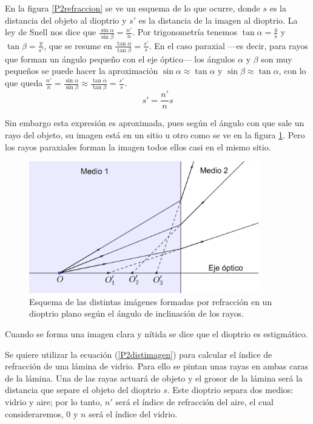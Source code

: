 \documentclass[12pt]{article}
\numberwithin{table}{section}
\numberwithin{figure}{section}
\numberwithin{equation}{section}
\DeclareMathOperator{\sen}{sin}
\begin{document}
En la figura \ref{P2refraccion} se ve un esquema de lo que ocurre, donde $s$ es la distancia del objeto al dioptrio y $s'$ es la distancia de la imagen al dioptrio. La ley de Snell nos dice que $\frac{\sen\alpha}{\sen\beta}=\frac{n'}{n}$. Por trigonometría tenemos $\tan\alpha=\frac{y}{s}$ y $\tan\beta=\frac{y}{s'}$, que se resume en $\frac{\tan\alpha}{\tan\beta}=\frac{s'}{s}$. En el caso paraxial ---es decir, para rayos que forman un ángulo pequeño con el eje óptico--- los ángulos $\alpha$ y $\beta$ son muy pequeños se puede hacer la aproximación $\sen\alpha\approx\tan\alpha$ y $\sen\beta\approx\tan\alpha$, con lo que queda $\frac{n'}{n}=\frac{\sen\alpha}{\sen\beta}\approx\frac{\tan\alpha}{\tan\beta}=\frac{s'}{s}$.
\begin{equation}\label{P2distimagen}
	s'=\frac{n'}{n}s
\end{equation} 

Sin embargo esta expresión es aproximada, pues según el ángulo con que sale un rayo del objeto, su imagen está en un sitio u otro como se ve en la figura \ref{P2astigmatismo}. Pero los rayos paraxiales forman la imagen todos ellos casi en el mismo sitio.

\begin{figure}[!ht]
	\small \centering \sffamily
	\begin{center}
		\includegraphics[width=10cm]{P2Astigmatismo.png}
		\caption{Esquema de las distintas imágenes formadas por refracción en un dioptrio plano según el ángulo de inclinación de los rayos.}
		\label{P2astigmatismo}
	\end{center}
\end{figure}

Cuando se forma una imagen clara y nítida se dice que el dioptrio es estigmático.

Se quiere utilizar la ecuación (\ref{P2distimagen}) para calcular el índice de refracción de una lámina de vidrio. Para ello se pintan unas rayas en ambas caras de la lámina. Una de las rayas actuará de objeto y el grosor de la lámina será la distancia que separe el objeto del dioptrio $s$. Este dioptrio separa dos medios: vidrio y aire; por lo tanto, $n'$ será el índice de refracción del aire, el cual consideraremos, 0 y $n$ será el índice del vidrio.
\end{document}
